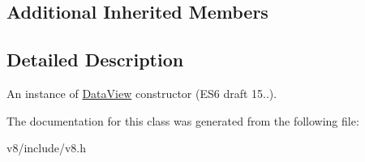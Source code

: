 \subsection*{Additional Inherited Members}


\subsection{Detailed Description}
An instance of \mbox{\hyperlink{classv8_1_1DataView}{Data\+View}} constructor (E\+S6 draft 15..). 

The documentation for this class was generated from the following file\+:\begin{DoxyCompactItemize}
\item 
v8/include/v8.\+h\end{DoxyCompactItemize}

